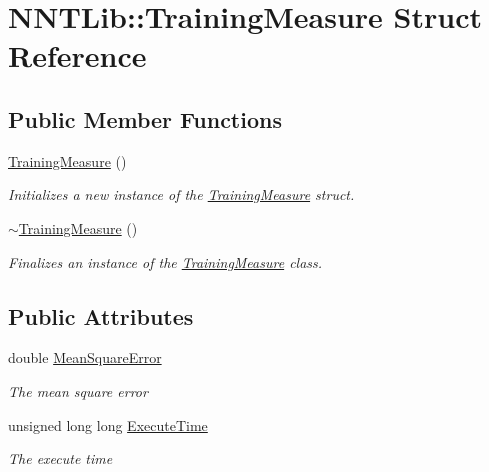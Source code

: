 \hypertarget{struct_n_n_t_lib_1_1_training_measure}{}\section{N\+N\+T\+Lib\+:\+:Training\+Measure Struct Reference}
\label{struct_n_n_t_lib_1_1_training_measure}
\subsection*{Public Member Functions}
\begin{DoxyCompactItemize}
\item 
\hyperlink{struct_n_n_t_lib_1_1_training_measure_a4a3960c136ba4a48d425a5f42548be69}{Training\+Measure} ()
\begin{DoxyCompactList}\small\item\em Initializes a new instance of the \hyperlink{struct_n_n_t_lib_1_1_training_measure}{Training\+Measure} struct. \end{DoxyCompactList}\item 
\hyperlink{struct_n_n_t_lib_1_1_training_measure_accf24a164322c91ca64fce04c3bf7ee1}{$\sim$\+Training\+Measure} ()
\begin{DoxyCompactList}\small\item\em Finalizes an instance of the \hyperlink{struct_n_n_t_lib_1_1_training_measure}{Training\+Measure} class. \end{DoxyCompactList}\end{DoxyCompactItemize}
\subsection*{Public Attributes}
\begin{DoxyCompactItemize}
\item 
double \hyperlink{struct_n_n_t_lib_1_1_training_measure_a03470415cd36f35e43b3ad0e784bbbbf}{Mean\+Square\+Error}
\begin{DoxyCompactList}\small\item\em The mean square error \end{DoxyCompactList}\item 
unsigned long long \hyperlink{struct_n_n_t_lib_1_1_training_measure_abbe43852bac79bd5b7acfe6151464c37}{Execute\+Time}
\begin{DoxyCompactList}\small\item\em The execute time \end{DoxyCompactList}\end{DoxyCompactItemize}


